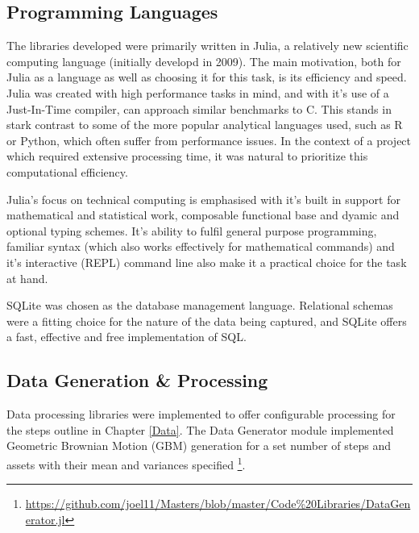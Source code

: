 \documentclass[a4paper,11pt,oneside]{article}
\theoremstyle{plain}
\theoremstyle{definition}
\begin{document}
\subsection{Programming Languages}

The libraries developed were primarily written in Julia, a relatively new scientific computing language (initially developd in 2009). The main motivation, both for Julia as a language as well as choosing it for this task, is its efficiency and speed. Julia was created with high performance tasks in mind, and with it's use of a Just-In-Time compiler, can approach similar benchmarks to C. This stands in stark contrast to some of the more popular analytical languages used, such as R or Python, which often suffer from performance issues. In the context of a project which required extensive processing time, it was natural to prioritize this computational efficiency. \newline

Julia's focus on technical computing is emphasised with it's built in support for mathematical and statistical work, composable functional base and dyamic and optional typing schemes. It's ability to fulfil general purpose programming, familiar syntax (which also works effectively for mathematical commands) and it's interactive (REPL) command line also make it a practical choice for the task at hand.\newline

SQLite was chosen as the database management language. Relational schemas were a fitting choice for the nature of the data being captured, and SQLite offers a fast, effective and free implementation of SQL.\newline


\subsection{Data Generation \& Processing}

Data processing libraries were implemented to offer configurable processing for the steps outline in Chapter \ref{Data}. The Data Generator module implemented Geometric Brownian Motion (GBM) generation for a set number of steps and assets with their mean and variances specified \footnote{\url{https://github.com/joel11/Masters/blob/master/Code\%20Libraries/DataGenerator.jl}}. \newline
	
\end{document}
